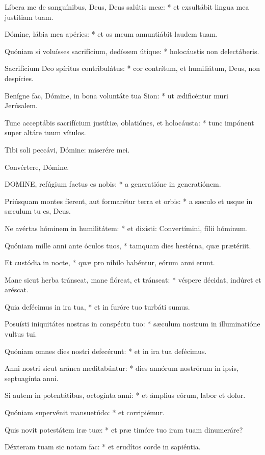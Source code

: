 Líbera me de sanguínibus, Deus, Deus salútis meæ: * et exsultábit lingua mea justítiam tuam.

Dómine, lábia mea apéries: * et os meum annuntiábit laudem tuam.

Quóniam si voluísses sacrifícium, dedíssem útique: * holocáustis non delectáberis.

Sacrifícium Deo spíritus contribulátus: * cor contrítum, et humiliátum, Deus, non despícies.

Benígne fac, Dómine, in bona voluntáte tua Sion: * ut ædificéntur muri Jerúsalem.

Tunc acceptábis sacrifícium justítiæ, oblatiónes, et holocáusta: * tunc impónent super altáre tuum vítulos.

 Tibi soli peccávi, Dómine: miserére mei.

 Convértere, Dómine.


\lettrine[lines=2]{D}{OMINE}, refúgium factus es nobis: * a generatióne in generatiónem.

Priúsquam montes fíerent, aut formarétur terra et orbis: * a sæculo et usque in sæculum tu es, Deus.

Ne avértas hóminem in humilitátem: * et dixísti: Convertímini, fílii hóminum.

Quóniam mille anni ante óculos tuos, * tamquam dies hestérna, quæ prætériit.

Et custódia in nocte, * quæ pro níhilo habéntur, eórum anni erunt.

Mane sicut herba tránseat, mane flóreat, et tránseat: * véspere décidat, indúret et aréscat.

Quia defécimus in ira tua, * et in furóre tuo turbáti sumus.

Posuísti iniquitátes nostras in conspéctu tuo: * sæculum nostrum in illuminatióne vultus tui.

Quóniam omnes dies nostri defecérunt: * et in ira tua defécimus.

Anni nostri sicut aránea meditabúntur: * dies annórum nostrórum in ipsis, septuagínta anni.

Si autem in potentátibus, octogínta anni: * et ámplius eórum, labor et dolor.

Quóniam supervénit mansuetúdo: * et corripiémur.

Quis novit potestátem iræ tuæ: * et præ timóre tuo iram tuam dinumeráre?

Déxteram tuam sic notam fac: * et erudítos corde in sapiéntia.

